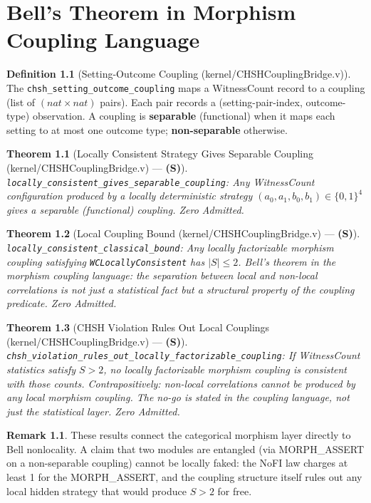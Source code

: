 \documentclass[11pt, a4paper]{report}
\theoremstyle{definition}
\newtheorem{definition}{Definition}[chapter]
\newtheorem{remark}{Remark}[chapter]
\theoremstyle{plain}
\newtheorem{theorem}{Theorem}[chapter]
\begin{document}
\chapter{Bell's Theorem in Morphism Coupling Language}

\begin{definition}[Setting-Outcome Coupling {\normalfont (kernel/CHSHCouplingBridge.v)}]
The \texttt{chsh\_setting\_outcome\_coupling} maps a WitnessCount record to a coupling (list of $(nat \times nat)$ pairs). Each pair records a (setting-pair-index, outcome-type) observation. A coupling is \textbf{separable} (functional) when it maps each setting to at most one outcome type; \textbf{non-separable} otherwise.
\end{definition}

\begin{theorem}[Locally Consistent Strategy Gives Separable Coupling {\normalfont (kernel/CHSHCouplingBridge.v)} --- \textbf{(S)}]
\texttt{locally\_consistent\_gives\_separable\_coupling}: Any WitnessCount configuration produced by a locally deterministic strategy $(a_0, a_1, b_0, b_1) \in \{0,1\}^4$ gives a separable (functional) coupling. Zero Admitted.
\end{theorem}

\begin{theorem}[Local Coupling Bound {\normalfont (kernel/CHSHCouplingBridge.v)} --- \textbf{(S)}]
\texttt{locally\_consistent\_classical\_bound}: Any locally factorizable morphism coupling satisfying \texttt{WCLocallyConsistent} has $|S| \le 2$. Bell's theorem in the morphism coupling language: the separation between local and non-local correlations is not just a statistical fact but a structural property of the coupling predicate. Zero Admitted.
\end{theorem}

\begin{theorem}[CHSH Violation Rules Out Local Couplings {\normalfont (kernel/CHSHCouplingBridge.v)} --- \textbf{(S)}]
\texttt{chsh\_violation\_rules\_out\_locally\_factorizable\_coupling}: If WitnessCount statistics satisfy $S > 2$, no locally factorizable morphism coupling is consistent with those counts. Contrapositively: non-local correlations cannot be produced by any local morphism coupling. The no-go is stated in the coupling language, not just the statistical layer. Zero Admitted.
\end{theorem}

\begin{remark}
These results connect the categorical morphism layer directly to Bell nonlocality. A claim that two modules are entangled (via MORPH\_ASSERT on a non-separable coupling) cannot be locally faked: the NoFI law charges at least 1 for the MORPH\_ASSERT, and the coupling structure itself rules out any local hidden strategy that would produce $S > 2$ for free.
\end{remark}
\end{document}
